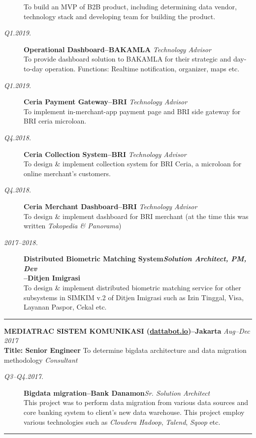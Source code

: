 \documentclass[12pt]{res} %
\begin{document}
\begin{resume}
\begin{description}
    To build an MVP of B2B product, including determining data vendor, technology stack and developing team for building the product.
    \item[{\sl {\footnotesize Q1.2019}.}] {\bf Operational Dashboard--BAKAMLA} \hfill {\sl Technology Advisor}\\
    To provide dashboard solution to BAKAMLA for their strategic and day-to-day operation. Functions: Realtime notification, organizer, maps etc.
    \item[{\sl {\footnotesize Q1.2019}.}] {\bf Ceria Payment Gateway--BRI} \hfill {\sl Technology Advisor}\\
    To implement in-merchant-app payment page and BRI side gateway for BRI ceria microloan.
    \item[{\sl {\footnotesize Q4.2018}.}] {\bf Ceria Collection System--BRI} \hfill {\sl Technology Advisor}\\
    To design \& implement collection system for BRI Ceria, a microloan for online merchant's customers.
    \item[{\sl {\footnotesize Q4.2018}.}] {\bf Ceria Merchant Dashboard--BRI} \hfill {\sl Technology Advisor}\\
    To design \& implement dashboard for BRI merchant (at the time this was written {\sl Tokopedia \& Panorama})
    \item[{\sl {\footnotesize 2017--2018}.}] {\bf Distributed Biometric Matching System\hfill {\sl Solution Architect, PM, Dev}\\--Ditjen Imigrasi}\\
    To design \& implement distributed biometric matching service for other subsystems in SIMKIM v.2 of Ditjen Imigrasi such as Izin Tinggal, Visa, Layanan Paspor, Cekal etc.
\end{description}
\begin{center}
	\rule{0.5\textwidth}{.2pt}
\end{center}

{\bf \uppercase{Mediatrac Sistem Komunikasi} (\href{https://dattabot.io}{dattabot.io})--Jakarta} \hfill {\sl Aug--Dec 2017} \\
{\bf Title: Senior Engineer} 
To determine bigdata architecture and data migration methodology \hfill {\sl Consultant}

\vspace{10pt} 
\begin{description}
    \item[{\sl {\footnotesize Q3--Q4.2017}.}] {\bf Bigdata migration--Bank Danamon}\hfill {\sl Sr. Solution Architect}\\
    This project was to perform data migration from various data sources and core banking system to client's new data warehouse. This project
    employ various technologies such as {\sl Cloudera Hadoop}, {\sl Talend}, {\sl Sqoop} etc.
\end{description}
\begin{center}
	\rule{0.5\textwidth}{.2pt}
\end{center}


\end{resume}
\end{document}
